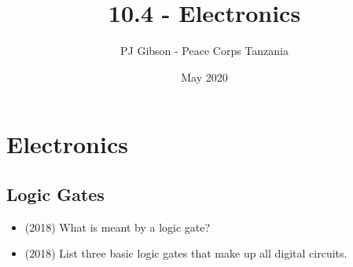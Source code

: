 \documentclass{article}
\title{10.4 - Electronics}
\author{PJ Gibson - Peace Corps Tanzania}
\date{May 2020}
\begin{document}
\maketitle


\section{Electronics}

\subsection{Logic Gates}
\begin{itemize}
\item (2018)  What is meant by a logic gate? 
\item (2018)  List three basic logic gates that make up all digital circuits. 
\end{itemize}
\end{document}
